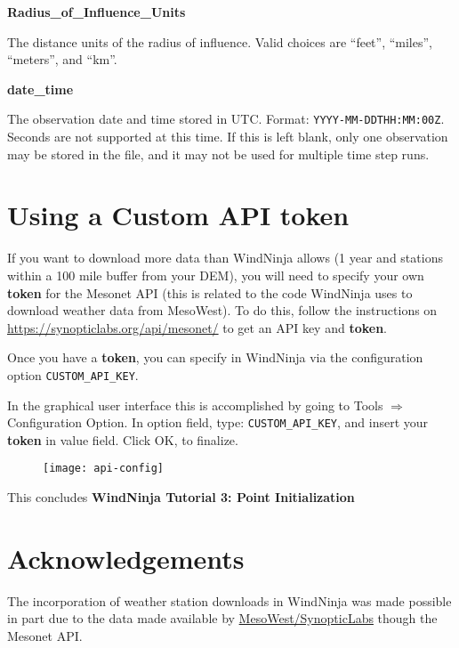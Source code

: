 \documentclass[12pt]{article}
\begin{document}
\textbf{Radius\_of\_Influence\_Units}

The distance units of the radius of influence.  Valid choices are “feet”, “miles”, “meters”, and “km”.

\textbf{date\_time}

The observation date and time stored in UTC. Format:  \texttt{YYYY-MM-DDTHH:MM:00Z}. Seconds are not supported at this time. If this is left blank, only one observation may be stored in the file, and it may not be used for multiple time step runs.

\section{Using a Custom API token}

If you want to download more data than WindNinja  allows (1 year and stations within a 100 mile buffer from your DEM), you will need to specify your own \textbf{token} for the Mesonet API (this is related to the code WindNinja uses to download weather data from MesoWest). To do this, follow the instructions on \url{https://synopticlabs.org/api/mesonet/} to get an API key and \textbf{token}.

Once you have a \textbf{token}, you can specify in WindNinja via the configuration option \texttt{CUSTOM\_API\_KEY}.

In the graphical user interface this is accomplished by going to Tools $\Rightarrow$ Configuration Option. In option field, type: \texttt{CUSTOM\_API\_KEY}, and insert your \textbf{token} in value field.  Click OK, to finalize.

\begin{figure}[H]
	\centering
	\label{}
	\texttt{[image: api-config]}
\end{figure}

This concludes \textbf{WindNinja Tutorial 3: Point Initialization}

\section*{Acknowledgements}
The incorporation of weather station downloads in WindNinja was made possible in part due to the data made available by \href{https://synopticlabs.org/api/mesonet/}{MesoWest/SynopticLabs} though the Mesonet API.
\end{document}
